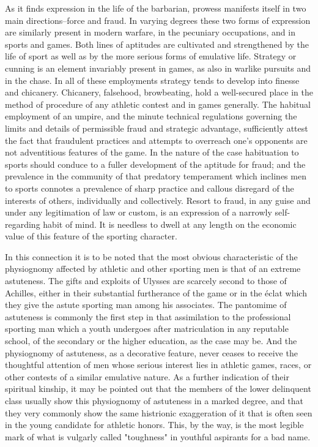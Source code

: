 \documentclass[12pt]{report}
\begin{document}
As it finds expression in the life of the barbarian, prowess manifests
itself in two main directions--force and fraud. In varying degrees these
two forms of expression are similarly present in modern warfare, in the
pecuniary occupations, and in sports and games. Both lines of aptitudes
are cultivated and strengthened by the life of sport as well as by the
more serious forms of emulative life. Strategy or cunning is an element
invariably present in games, as also in warlike pursuits and in the
chase. In all of these employments strategy tends to develop into
finesse and chicanery. Chicanery, falsehood, browbeating, hold a
well-secured place in the method of procedure of any athletic contest
and in games generally. The habitual employment of an umpire, and
the minute technical regulations governing the limits and details of
permissible fraud and strategic advantage, sufficiently attest the fact
that fraudulent practices and attempts to overreach one's opponents
are not adventitious features of the game. In the nature of the case
habituation to sports should conduce to a fuller development of
the aptitude for fraud; and the prevalence in the community of that
predatory temperament which inclines men to sports connotes a prevalence
of sharp practice and callous disregard of the interests of others,
individually and collectively. Resort to fraud, in any guise and under
any legitimation of law or custom, is an expression of a narrowly
self-regarding habit of mind. It is needless to dwell at any length on
the economic value of this feature of the sporting character.

In this connection it is to be noted that the most obvious
characteristic of the physiognomy affected by athletic and other
sporting men is that of an extreme astuteness. The gifts and exploits
of Ulysses are scarcely second to those of Achilles, either in their
substantial furtherance of the game or in the éclat which they give the
astute sporting man among his associates. The pantomime of astuteness
is commonly the first step in that assimilation to the professional
sporting man which a youth undergoes after matriculation in any
reputable school, of the secondary or the higher education, as the case
may be. And the physiognomy of astuteness, as a decorative feature,
never ceases to receive the thoughtful attention of men whose serious
interest lies in athletic games, races, or other contests of a similar
emulative nature. As a further indication of their spiritual kinship,
it may be pointed out that the members of the lower delinquent class
usually show this physiognomy of astuteness in a marked degree, and that
they very commonly show the same histrionic exaggeration of it that is
often seen in the young candidate for athletic honors. This, by the
way, is the most legible mark of what is vulgarly called "toughness" in
youthful aspirants for a bad name.
\end{document}
